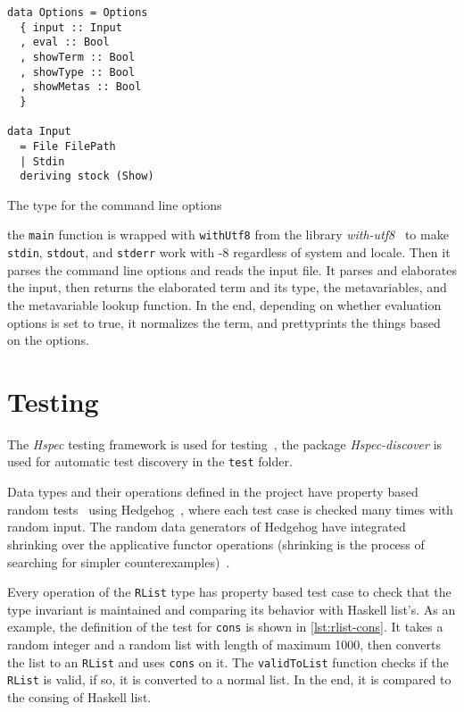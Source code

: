 \begin{listing}
  \begin{verbatim}
data Options = Options
  { input :: Input
  , eval :: Bool
  , showTerm :: Bool
  , showType :: Bool
  , showMetas :: Bool
  }

data Input
  = File FilePath
  | Stdin
  deriving stock (Show)
  \end{verbatim}
  \caption{The type for the command line options}\label{lst:opts}
\end{listing}

the \texttt{main} function is wrapped with \texttt{withUtf8}
from the library \emph{with-utf8}~\cite{with-utf8} to make \texttt{stdin},
\texttt{stdout}, and \texttt{stderr} work with -8 regardless of system
and locale. Then it parses the command line options and reads the input file. It
parses and elaborates the input, then returns the elaborated term and its type,
the metavariables, and the metavariable lookup function. In the end, depending
on whether evaluation options is set to true, it normalizes the term, and
prettyprints the things based on the options.

\section{Testing}\label{sec:test}

The \emph{Hspec} testing framework is used for testing~\cite{hspec}, the package
\emph{Hspec-discover} is used for automatic test discovery in the \texttt{test}
folder.

Data types and their operations defined in the project have property based
random tests~\cite{quickcheck, quickcheck-2} using Hedgehog~\cite{hedgehog},
where each test case is checked many times with random input. The random data
generators of Hedgehog have integrated shrinking over the applicative functor
operations (shrinking is the process of searching for simpler
counterexamples)~\cite{shrinking}.

Every operation of the \texttt{RList} type has property based test case
to check that the type invariant is maintained and comparing its behavior with
Haskell list's. As an example, the definition of the test for
\texttt{cons} is shown in \cref{lst:rlist-cons}. It takes a random
integer and a random list with length of maximum 1000, then converts the list to
an \texttt{RList} and uses \texttt{cons} on it. The
\texttt{validToList} function checks if the \texttt{RList} is
valid, if so, it is converted to a normal list. In the end, it is compared to
the consing of Haskell list.

